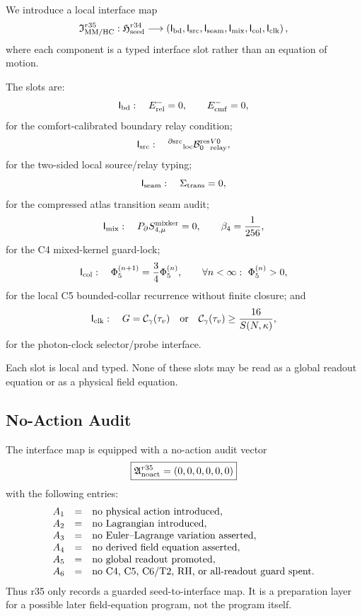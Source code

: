 We introduce a local interface map
\[
\mathfrak I_{\rm MM/HC}^{r35}
:
\mathfrak H_{\rm seed}^{r34}
\longrightarrow
\left(
\mathsf I_{\rm bd},
\mathsf I_{\rm src},
\mathsf I_{\rm seam},
\mathsf I_{\rm mix},
\mathsf I_{\rm col},
\mathsf I_{\rm clk}
\right),
\]
where each component is a typed interface slot rather than an equation of
motion.

The slots are:
\[
\mathsf I_{\rm bd}:\quad
E_{\rm rel}^{-}=0,
\qquad
E_{\rm cmf}^{-}=0,
\]
for the comfort-calibrated boundary relay condition;
\[
\mathsf I_{\rm src}:\quad
{}^{\partial{\rm src}}{}_{\rm loc}\mathcal B_0^{\rm res}{}^{V0}_{\rm relay},
\]
for the two-sided local source/relay typing;
\[
\mathsf I_{\rm seam}:\quad
\Sigma_{\rm trans}=0,
\]
for the compressed atlas transition seam audit;
\[
\mathsf I_{\rm mix}:\quad
P_{\partial}S_{4,\mu}^{\rm mixker}=0,
\qquad
\beta_4=\frac1{256},
\]
for the C4 mixed-kernel guard-lock;
\[
\mathsf I_{\rm col}:\quad
\Phi_5^{(n+1)}=\frac34\Phi_5^{(n)},
\qquad
\forall n<\infty:\ \Phi_5^{(n)}>0,
\]
for the local C5 bounded-collar recurrence without finite closure; and
\[
\mathsf I_{\rm clk}:\quad
G=\mathcal C_{\gamma}(\tau_v)
\quad\hbox{or}\quad
\mathcal C_{\gamma}(\tau_v)\geq \frac{16}{S(N,\kappa)},
\]
for the photon-clock selector/probe interface.

Each slot is local and typed.  None of these slots may be read as a global
readout equation or as a physical field equation.

\subsection{No-Action Audit}
\label{subsec:r35-no-action-audit}

The interface map is equipped with a no-action audit vector
\[
\boxed{
\mathfrak A_{\rm noact}^{r35}
=
(0,0,0,0,0,0)
}
\]
with the following entries:
\[
\begin{array}{ccl}
A_1&=&\hbox{no physical action introduced},\\
A_2&=&\hbox{no Lagrangian introduced},\\
A_3&=&\hbox{no Euler--Lagrange variation asserted},\\
A_4&=&\hbox{no derived field equation asserted},\\
A_5&=&\hbox{no global readout promoted},\\
A_6&=&\hbox{no C4, C5, C6/T2, RH, or all-readout guard spent}.
\end{array}
\]
Thus r35 only records a guarded seed-to-interface map.  It is a preparation
layer for a possible later field-equation program, not the program itself.

